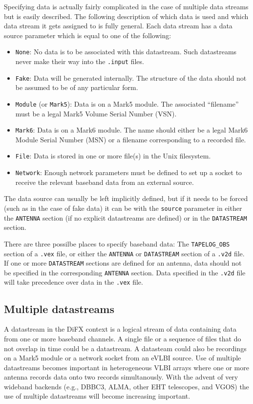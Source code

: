 \documentclass[12pt]{article}
\begin{document}
Specifying data is actually fairly complicated in the case of multiple data streams but is easily described.
The following description of which data is used and which data stream it gets assigned to is fully general.
Each data stream has a data source parameter which is equal to one of the following:
\begin{itemize}
\item {\tt None}: No data is to be associated with this datastream.  Such datastreams never make their way into the {\tt .input} files.
\item {\tt Fake}: Data will be generated internally.  The structure of the data should not be assumed to be of any particular form.
\item {\tt Module} (or {\tt Mark5}): Data is on a Mark5 module.  The associated ``filename'' must be a legal Mark5 Volume Serial Number (VSN).
\item {\tt Mark6}: Data is on a Mark6 module.  The name should either be a legal Mark6 Module Serial Number (MSN) or a filename corresponding to a recorded file.
\item {\tt File}: Data is stored in one or more file(s) in the Unix filesystem.
\item {\tt Network}: Enough network parameters must be defined to set up a socket to receive the relevant baseband data from an external source.
\end{itemize}
The data source can usually be left implicitly defined, but if it needs to be forced (such as in the case of fake data) it can be with the {\tt source} parameter in either the {\tt ANTENNA} section (if no explicit datastreams are defined) or in the {\tt DATASTREAM} section.

There are three possilbe places to specify baseband data: The {\tt TAPELOG\_OBS} section of a {\tt .vex} file, or either the {\tt ANTENNA} or {\tt DATASTREAM} section of a {\tt .v2d} file.
If one or more {\tt DATASTREAM} sections are defined for an antenna, data should not be specified in the corresponding {\tt ANTENNA} section.  
Data specified in the {\tt .v2d} file will take precedence over data in the {\tt .vex} file.


\subsection{Multiple datastreams} \label{sec:mds}

A datastream in the DiFX context is a logical stream of data containing data from one or more baseband channels.
A single file or a sequence of files that do not overlap in time could be a datastream.  A datasteam could also be recordings on a Mark5 module or a network socket from an eVLBI source.
Use of multiple datastreams becomes important in heterogeneous VLBI arrays where one or more antenna records data onto two records simultanously.
With the advent of very wideband backends (e.g., DBBC3, ALMA, other EHT telescopes, and VGOS) the use of multiple datastreams will become increasing important.
\end{document}
